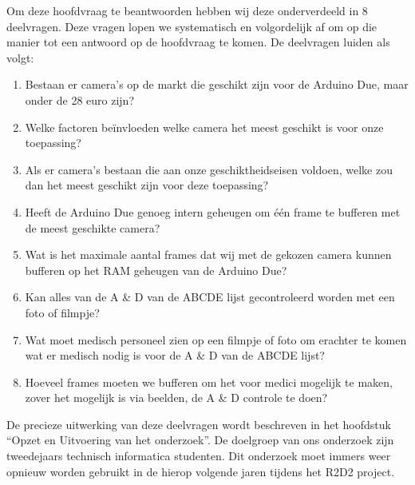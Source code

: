 \documentclass{article}
\begin{document}
Om deze hoofdvraag te beantwoorden hebben wij deze onderverdeeld in 8 deelvragen. Deze vragen lopen we systematisch en volgordelijk af om op die manier tot een antwoord op de hoofdvraag te komen. De deelvragen luiden als volgt:

\begin{enumerate}
	\item Bestaan er camera’s op de markt die geschikt zijn voor de Arduino Due, maar onder de 28 euro zijn?
	\item Welke factoren beïnvloeden welke camera het meest geschikt is voor onze toepassing? 
	\item Als er camera’s bestaan die aan onze geschiktheidseisen voldoen, welke zou dan het meest geschikt zijn voor deze toepassing? 
	\item Heeft de Arduino Due genoeg intern geheugen om één frame te bufferen met de meest geschikte camera? 
	\item Wat is het maximale aantal frames dat wij met de gekozen camera kunnen bufferen op het RAM geheugen van de Arduino Due? 
	\item Kan alles van de A {\&} D van de ABCDE lijst gecontroleerd worden met een foto of filmpje? 
	\item Wat moet medisch personeel zien op een filmpje of foto om erachter te komen wat er medisch nodig is voor de A {\&} D van de ABCDE lijst? 
	\item Hoeveel frames moeten we bufferen om het voor medici mogelijk te maken, zover het mogelijk is via beelden, de A {\&} D controle te doen? 
\end{enumerate}
De precieze uitwerking van deze deelvragen wordt beschreven in het hoofdstuk “Opzet en Uitvoering van het onderzoek”.
De doelgroep van ons onderzoek zijn tweedejaars technisch informatica studenten. Dit onderzoek moet immers weer opnieuw worden gebruikt in de hierop volgende jaren tijdens het R2D2 project.

\end{document}
